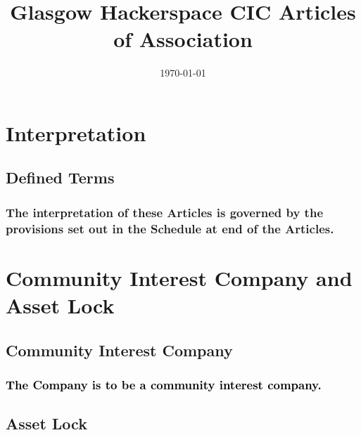 \documentclass[12pt]{article}
\title{Glasgow Hackerspace CIC Articles of Association}
\date{\today}
\def\fakecolour{black}
\begin{document}
\renewcommand\contentsname{
    \centering\bfseries\Large{Index to the Articles}\justifying
}

\maketitle
\newpage
{\hypersetup{linkbordercolor=white}\tableofcontents}
\newpage

\vspace{1.5\baselineskip}\section*{Interpretation}

\subsection{Defined Terms}
\subsubsection[General interpretation of Articles]{The interpretation of these Articles is governed by the provisions set out in the Schedule at end of the Articles.}

\vspace{1.5\baselineskip}\section*{Community Interest Company and Asset Lock}

\subsection{Community Interest Company}
\subsubsection[Community Interest Company]{\textcolor{\fakecolour}{The Company is to be a community interest company.}}
\subsection{Asset Lock}
\end{document}
